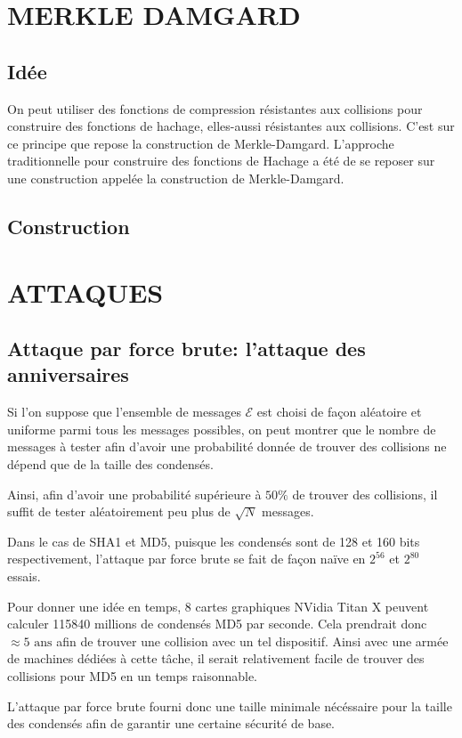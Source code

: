 \documentclass[10.5pt, a4paper, twoside, openright]{report}
\begin{document}
\chapter{MERKLE DAMGARD}
\section{Idée}
On peut utiliser des fonctions de compression résistantes aux collisions pour construire des fonctions de hachage, elles-aussi résistantes aux collisions.
C’est sur ce principe que repose la construction de Merkle-Damgard.
L’approche traditionnelle pour construire des fonctions de Hachage a été de se reposer sur une construction appelée la construction de Merkle-Damgard.
\section{Construction}

\chapter{ATTAQUES}
\section{Attaque par force brute: l’attaque des anniversaires}
Si l'on suppose que l'ensemble de messages $\mathcal{E}$ est choisi de façon aléatoire et uniforme parmi tous les messages possibles, on peut montrer que le nombre de messages à tester afin d'avoir une probabilité donnée de trouver des collisions ne dépend que de la taille des condensés.

Ainsi, afin d'avoir une probabilité supérieure à $50\%$ de trouver des collisions, il suffit de tester aléatoirement peu plus de $\sqrt{N}$ messages.

Dans le cas de SHA1 et MD5, puisque les condensés sont de 128 et 160 bits respectivement, l'attaque par force brute se fait de façon naïve en $2^56$ et $2^80$ essais.

Pour donner une idée en temps, 8 cartes graphiques NVidia Titan X peuvent calculer 115840 millions de condensés MD5 par seconde. Cela prendrait donc $ \approx 5 \mbox{ ans}$ afin de trouver une collision avec un tel dispositif.
Ainsi avec une armée de machines dédiées à cette tâche, il serait relativement facile de trouver des collisions pour MD5 en un temps raisonnable.

L'attaque par force brute fourni donc une taille minimale nécéssaire pour la taille des condensés afin de garantir une certaine sécurité de base.
\end{document}
